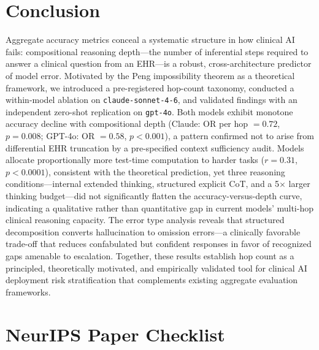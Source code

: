 \documentclass{article}
\begin{document}
\section{Conclusion}

Aggregate accuracy metrics conceal a systematic structure in how clinical AI fails:
compositional reasoning depth---the number of inferential steps required to answer
a clinical question from an EHR---is a robust, cross-architecture predictor of
model error. Motivated by the Peng impossibility theorem as a theoretical framework,
we introduced a pre-registered hop-count taxonomy, conducted a within-model ablation
on \texttt{claude-sonnet-4-6}, and validated findings with an independent zero-shot
replication on \texttt{gpt-4o}. Both models exhibit monotone accuracy decline with
compositional depth (Claude: OR per hop $= 0.72$, $p = 0.008$; GPT-4o: OR $= 0.58$,
$p < 0.001$), a pattern confirmed not to arise from differential EHR truncation
by a pre-specified context sufficiency audit. Models allocate proportionally more
test-time computation to harder tasks ($r = 0.31$, $p < 0.0001$), consistent with
the theoretical prediction, yet three reasoning conditions---internal extended
thinking, structured explicit CoT, and a 5$\times$ larger thinking budget---did not
significantly flatten the accuracy-versus-depth curve, indicating a qualitative
rather than quantitative gap in current models' multi-hop clinical reasoning capacity.
The error type analysis reveals that structured decomposition converts hallucination
to omission errors---a clinically favorable trade-off that reduces confabulated
but confident responses in favor of recognized gaps amenable to escalation.
Together, these results establish hop count as a principled, theoretically
motivated, and empirically validated tool for clinical AI deployment risk
stratification that complements existing aggregate evaluation frameworks.




\appendix

\section{NeurIPS Paper Checklist}
\end{document}
